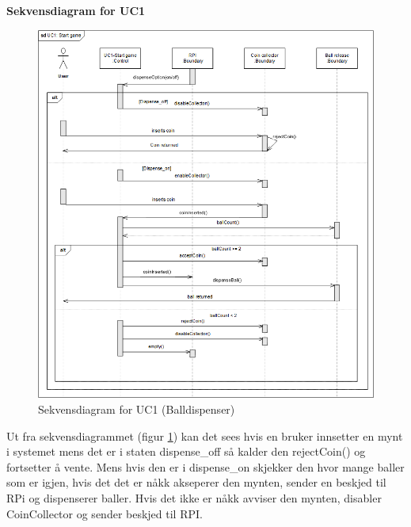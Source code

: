 \documentclass[Rapport/Rapport_main.tex]{subfiles}
\begin{document}
\textbf{Sekvensdiagram for UC1}\\
\begin{figure}[H]
    \centering
    \includegraphics[width=\textwidth]{Arkitektur/Softwarearkitektur/Applikationsmodel/BallDispenser/graphicsBallDispenser/sdUC1.png}
    \caption{Sekvensdiagram for UC1 (Balldispenser)}
    \label{fig:BallDispScUC1}
\end{figure}

Ut fra sekvensdiagrammet (figur \ref{fig:BallDispScUC1}) kan det sees hvis en bruker innsetter en mynt i systemet mens det er i staten dispense\_off så kalder den rejectCoin() og fortsetter å vente. Mens hvis den er i dispense\_on skjekker den hvor mange baller som er igjen, hvis det det er nåkk akseperer den mynten, sender en beskjed til RPi og dispenserer baller. Hvis det ikke er nåkk avviser den mynten, disabler CoinCollector og sender beskjed til RPI.\\\\
\end{document}
